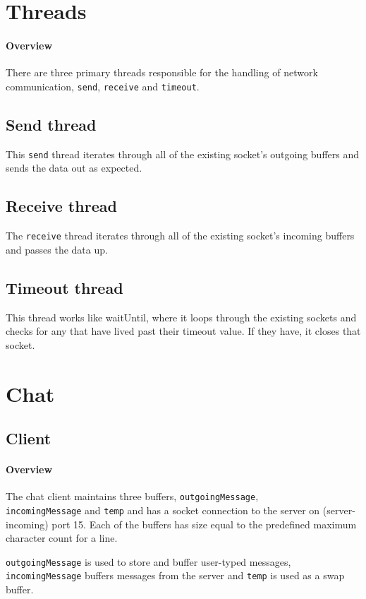 \documentclass[]{article}
\begin{document}
\section{Threads}
\paragraph{Overview}
There are three primary threads responsible for the handling of network communication, \texttt{send}, \texttt{receive} and \texttt{timeout}.

\subsection{Send thread}
This \texttt{send} thread iterates through all of the existing socket's outgoing buffers and sends the data out as expected.
\subsection{Receive thread}
The \texttt{receive} thread iterates through all of the existing socket's incoming buffers and passes the data up.
\subsection{Timeout thread}
This thread works like waitUntil, where it loops through the existing sockets and checks for any that have lived past their timeout value. If they have, it closes that socket.

\section{Chat}
\subsection{Client}
\paragraph{Overview} The chat client maintains three buffers, \texttt{outgoingMessage}, \\ \texttt{incomingMessage} and \texttt{temp} and has a socket connection to the server on (server-incoming) port 15. Each of the buffers has size equal to the predefined maximum character count for a line.

\texttt{outgoingMessage} is used to store and buffer user-typed messages, \\ \texttt{incomingMessage} buffers messages from the server and \texttt{temp} is used as a swap buffer.
\end{document}

